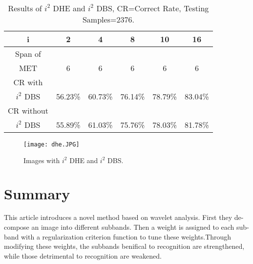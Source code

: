 \documentclass[10pt,twocolumn,letterpaper]{article}
\begin{document}
\begin{table}[htbp]
\begin{center}
\begin{tabular}{cccccc}
\hline
i &2&4&8&10&16\\
\hline
Span of \\MET & 6 & 6 & 6 & 6 & 6\\
\hline
CR with \\ $i^2$ DBS & 56.23\% & 60.73\% & 76.14\%& 78.79\% & 83.04\%\\
CR without \\ $i^2$ DBS & 55.89\% & 61.03\% & 75.76\%& 78.03\% & 81.78\%\\
\hline
\end{tabular}
\end{center}
\caption{Results of $i^2$ DHE and $i^2$ DBS, CR=Correct Rate, Testing Samples=2376.}
\end{table}

\begin{figure}[t]
\begin{center}

\texttt{[image: dhe.JPG]}
\end{center}
 \caption{Images with $i^2$ DHE and $i^2$ DBS.}
\label{fig:long}
\label{fig:onecol}
\end{figure}

\section{Summary}
 This article introduces a novel method based on wavelet analysis. First they de-compose an image into different subbands. Then a weight is assigned to each sub-band with a regularization criterion function to tune these weights.Through modifying these weights, the subbands benifical to recognition are strengthened, while those detrimental to recognition are weakened.
{\small


}
\end{document}

